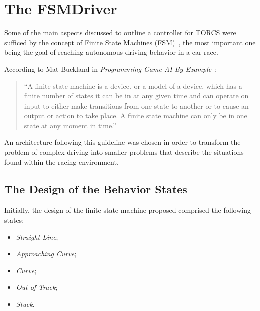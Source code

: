 \section{\textbf{The FSMDriver}} \label{sec:FSM}
	
	Some of the main aspects discussed to outline a controller for TORCS were sufficed by the concept of Finite State Machines (FSM)~\cite{Millington:2006:FSM}, the most important one being the goal of reaching autonomous driving behavior in a car race.

	According to Mat Buckland in \emph{Programming Game AI By Example}~\cite{Buckland:2005:AI}:
	
	\begin{quotation} \itshape
		
		``A finite state machine is a device, or a model of a device, which has a finite number of states it can be in at any given time and can operate on input to either make transitions from one state to another or to cause an output or action to take place. A finite state machine can only be in one state at any moment in time.''
		
	\end{quotation}
	
	An architecture following this guideline was chosen in order to transform the problem of complex driving into smaller problems that describe the situations found within the racing environment.
	
\subsection{The Design of the Behavior States}
	
	Initially, the design of the finite state machine proposed comprised the following states:
	
	\begin{itemize}

	\item \emph{Straight Line};
	
	\item \emph{Approaching Curve};
	
	\item \emph{Curve};
	
	\item \emph{Out of Track};
	
	\item \emph{Stuck}.

	\end{itemize}
	
